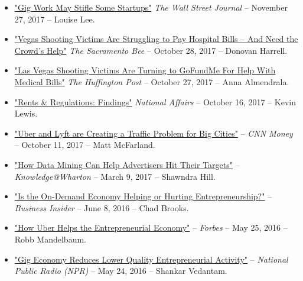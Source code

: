 \documentclass[10.5pt,letterpaper,sans]{moderncv}        %
\begin{document}
\begin{itemize}
\item \textcolor{gray}{\href{https://www.wsj.com/articles/gig-work-may-stifle-some-startups-1511751901}{"Gig Work May Stifle Some Startups"}}  \textit{The Wall Street Journal} 
-- November 27, 2017 -- Louise Lee.

\item \textcolor{gray}{\href{http://www.sacbee.com/news/nation-world/national/article181505276.html}{"Vegas Shooting Victims Are Struggling to Pay Hospital Bills -- And Need the Crowd's Help"}} \textit{The Sacramento Bee} -- October 28, 2017 -- Donovan Harrell.

\item \textcolor{gray}{\href{https://www.huffingtonpost.com/entry/vegas-shooting-victims-crowdfunding_us_59f3a51be4b07fdc5fbe465c}{"Las Vegas Shooting Victims Are Turning to GoFundMe For Help With Medical Bills"}} \textit{The Huffington Post} -- October 27, 2017 -- Anna Almendrala.

\item \textcolor{gray}{\href{https://nationalaffairs.com/blog/detail/findings-a-daily-roundup/rents-and-regulations}{"Rents \& Regulations: Findings"}} \textit{National Affairs} -- October 16, 2017 -- Kevin Lewis.

\item \textcolor{gray}{\href{https://money.cnn.com/2017/10/11/technology/future/ride-hailing-cities-public-transit/index.html?section=money_topstories}{"Uber and Lyft are Creating a Traffic Problem for Big Cities"}} -- \textit{CNN Money} -- October 11, 2017 -- Matt McFarland.

\item \textcolor{gray}{\href{http://knowledge.wharton.upenn.edu/article/how-data-mining-can-help-advertisers/}{"How Data Mining Can Help Advertisers Hit Their Targets"}} -- \textit{Knowledge@Wharton} -- March 9, 2017 -- Shawndra Hill.

\item \textcolor{gray}{\href{http://www.businessnewsdaily.com/9132-on-demand-economy-effect.html}{"Is the On-Demand Economy Helping or Hurting Entrepreneurship?"}} -- \textit{Business Insider} -- June 8, 2016 -- Chad Brooks.

\item \textcolor{gray}{\href{http://www.forbes.com/sites/robbmandelbaum/2016/05/25/how-uber-helps-the-entrepreneurial-economy}{"How Uber Helps the Entrepreneurial Economy"}} -- \textit{Forbes} -- May 25, 2016 -- Robb Mandelbaum.

\item \textcolor{gray}{\href{http://www.npr.org/2016/05/24/479274199/gig-economy-reduces-lower-quality-entrepreneurial-activity-study-shows}{"Gig Economy Reduces Lower Quality Entrepreneurial Activity"}} -- \textit{National Public Radio (NPR)} -- May 24, 2016 -- Shankar Vedantam.


\end{itemize}
\end{document}
